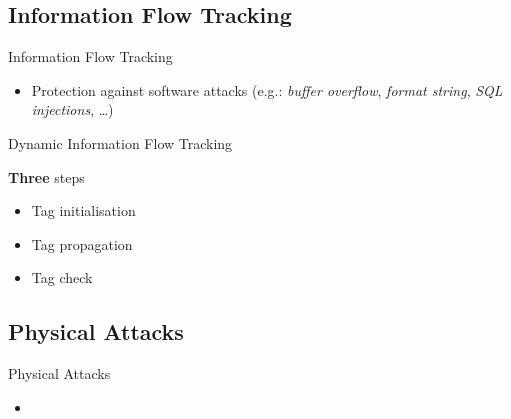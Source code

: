 \subsection{Information Flow Tracking}
\begin{frame}{Information Flow Tracking}
    \begin{block}{}
        \begin{itemize}
            [square]
            \justifying
            \item Protection against software attacks (e.g.: \textit{buffer overflow}, \textit{format string}, \textit{SQL injections}, \ldots)~\cite{BSMCVEJCO-21-acmcsur, HAK-21-acmcsur}
        \end{itemize}
    \end{block}
\end{frame}

\begin{frame}{Dynamic Information Flow Tracking}
    \begin{minipage}[c]{0.35\linewidth}
        \begingroup
        \begin{block}{\textbf{Three} steps}
            \begin{itemize}
                \item<1-> Tag initialisation
                \item<2-> Tag propagation
                \item<3-> Tag check
            \end{itemize}
        \end{block}
        \endgroup
    \end{minipage}\hfill%
    \begin{minipage}[c]{0.6\linewidth}
        \begin{figure}
            \centering
            \label{fig:schemaDIFT}
        \end{figure}
    \end{minipage}
\end{frame}
\subsection{Physical Attacks}
\begin{frame}{Physical Attacks}
    \begin{block}{}
        \begin{itemize}
            [square]
            \justifying
            \item 
        \end{itemize}
    \end{block}
\end{frame}
